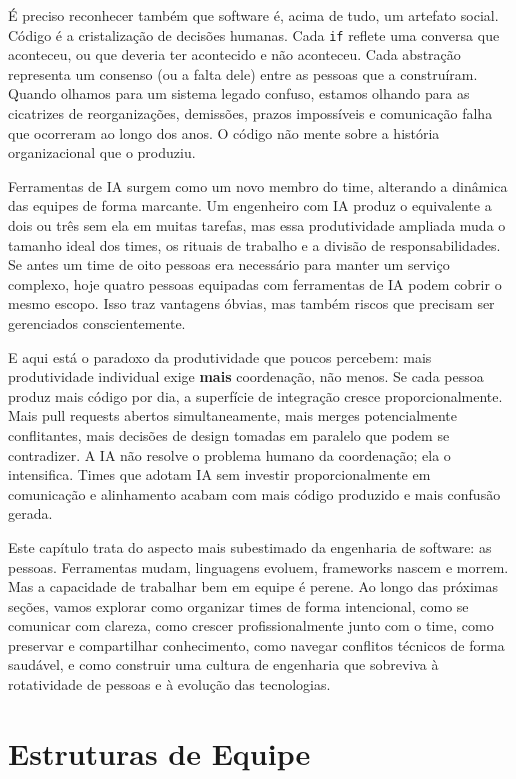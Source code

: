 É preciso reconhecer também que software é, acima de tudo, um artefato social.
Código é a cristalização de decisões humanas. Cada \texttt{if} reflete uma
conversa que aconteceu, ou que deveria ter acontecido e não aconteceu. Cada
abstração representa um consenso (ou a falta dele) entre as pessoas que a
construíram. Quando olhamos para um sistema legado confuso, estamos olhando
para as cicatrizes de reorganizações, demissões, prazos impossíveis e
comunicação falha que ocorreram ao longo dos anos. O código não mente sobre
a história organizacional que o produziu.

Ferramentas de IA surgem como um novo membro do time, alterando
a dinâmica das equipes de forma marcante. Um engenheiro com IA produz o equivalente
a dois ou três sem ela em muitas tarefas, mas essa produtividade ampliada
muda o tamanho ideal dos times, os rituais de trabalho e a divisão de
responsabilidades. Se antes um time de oito pessoas era necessário para
manter um serviço complexo, hoje quatro pessoas equipadas com ferramentas de
IA podem cobrir o mesmo escopo. Isso traz vantagens óbvias, mas também
riscos que precisam ser gerenciados conscientemente.

E aqui está o paradoxo da produtividade que poucos percebem: mais produtividade
individual exige \textbf{mais} coordenação, não menos. Se cada pessoa produz
mais código por dia, a superfície de integração cresce proporcionalmente. Mais
pull requests abertos simultaneamente, mais merges potencialmente conflitantes,
mais decisões de design tomadas em paralelo que podem se contradizer. A IA
não resolve o problema humano da coordenação; ela o intensifica. Times que
adotam IA sem investir proporcionalmente em comunicação e alinhamento acabam
com mais código produzido e mais confusão gerada.

Este capítulo trata do aspecto mais subestimado da engenharia de software: as
pessoas. Ferramentas mudam, linguagens evoluem, frameworks nascem e morrem.
Mas a capacidade de trabalhar bem em equipe é perene. Ao longo das próximas
seções, vamos explorar como organizar times de forma intencional, como se
comunicar com clareza, como crescer profissionalmente junto com o time, como
preservar e compartilhar conhecimento, como navegar conflitos técnicos de
forma saudável, e como construir uma cultura de engenharia que sobreviva à
rotatividade de pessoas e à evolução das tecnologias.

\section{Estruturas de Equipe}

